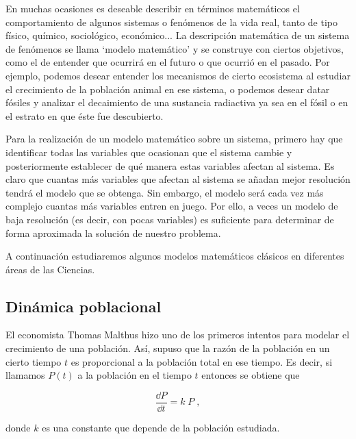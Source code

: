 \begin{small}
En muchas ocasiones es deseable describir en términos matemáticos el comportamiento de algunos sistemas o fenómenos de la vida real, tanto de tipo físico, químico, sociológico, económico... La descripción matemática de un sistema de fenómenos se llama `modelo matemático' y se construye con ciertos objetivos, como el de entender que ocurrirá en el futuro o que ocurrió en el pasado. Por ejemplo, podemos desear entender los mecanismos de cierto ecosistema al estudiar el crecimiento de la población animal en ese sistema, o podemos desear datar fósiles y analizar el decaimiento de una sustancia radiactiva ya sea en el fósil o en el estrato en que éste fue descubierto. 

Para la realización de un modelo matemático sobre un sistema, primero hay que identificar todas las variables que ocasionan que el sistema cambie y posteriormente establecer de qué manera estas variables afectan al sistema. Es claro que cuantas más variables que afectan al sistema se añadan mejor resolución tendrá el modelo que se obtenga. Sin embargo, el modelo será cada vez más complejo cuantas más variables entren en juego. Por ello, a veces un modelo de baja resolución (es decir, con pocas variables) es suficiente para determinar de forma aproximada la solución de nuestro problema. 

A continuación estudiaremos algunos modelos matemáticos clásicos en diferentes áreas de las Ciencias.

\subsection{Dinámica poblacional}
	
El economista Thomas Malthus hizo uno de los primeros intentos para modelar el crecimiento de una población. Así, supuso que la razón de la población en un cierto tiempo $t$ es proporcional a la población total en ese tiempo. Es decir, si llamamos $P(t)$ a la población en el tiempo $t$ entonces se obtiene que 

\begin{equation*}
	\dfrac {\dd P}{\dd t}=k\; P\; ,
\end{equation*}

donde $k$ es una constante que depende de la población estudiada.


\end{small}
